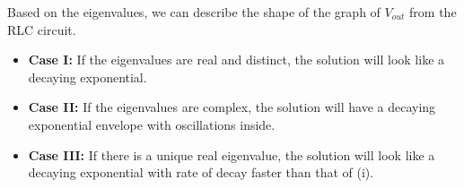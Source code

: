Based on the eigenvalues, we can describe the shape of the graph of $V_{out}$ from the RLC circuit.
\begin{itemize}
\item \textbf{Case I:} If the eigenvalues are real and distinct, the solution will look like a decaying exponential.
\item \textbf{Case II:} If the eigenvalues are complex, the solution will have a decaying exponential envelope with oscillations inside.
\item \textbf{Case III:} If there is a unique real eigenvalue, the solution will look like a decaying exponential with rate of decay faster than that of (i).
\end{itemize}


	 
	 
